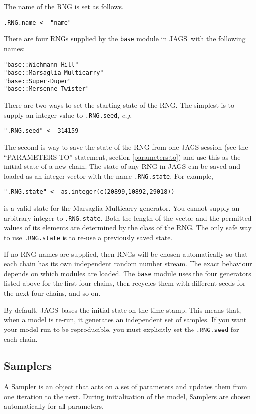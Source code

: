 \documentclass[11pt, a4paper, titlepage]{report}
\newcommand{\JAGS}{\textsf{JAGS}}
\begin{document}
The name of the RNG is set as follows. 
\begin{verbatim}
.RNG.name <- "name"
\end{verbatim}
There are four RNGs supplied by the \texttt{base} module in \JAGS\
with the following names:
\begin{verbatim}
"base::Wichmann-Hill"
"base::Marsaglia-Multicarry"
"base::Super-Duper"
"base::Mersenne-Twister"
\end{verbatim}

There are two ways to set the starting state of the RNG. The simplest
is to supply an integer value to \texttt{.RNG.seed}, {\em e.g.}
\begin{verbatim}
".RNG.seed" <- 314159
\end{verbatim}
The second is way to save the state of the RNG from one JAGS session
(see the ``PARAMETERS TO'' statement, section \ref{parameters:to}) and
use this as the initial state of a new chain. The state of any RNG in
JAGS can be saved and loaded as an integer vector with the name
\texttt{.RNG.state}. For example,
\begin{verbatim}
".RNG.state" <- as.integer(c(20899,10892,29018))
\end{verbatim}
is a valid state for the Marsaglia-Multicarry generator.  You cannot
supply an arbitrary integer to \texttt{.RNG.state}. Both the length of
the vector and the permitted values of its elements are determined by
the class of the RNG. The only safe way to use \texttt{.RNG.state} is
to re-use a previously saved state.

If no RNG names are supplied, then RNGs will be chosen automatically
so that each chain has its own independent random number stream.  The
exact behaviour depends on which modules are loaded. The \texttt{base}
module uses the four generators listed above for the first four
chains, then recycles them with different seeds for the next four
chains, and so on.  

By default, \JAGS\ bases the initial state on the time stamp. This
means that, when a model is re-run, it generates an independent set of
samples. If you want your model run to be reproducible, you must
explicitly set the \verb+.RNG.seed+ for each chain.

\subsection{Samplers}

A Sampler is an object that acts on a set of parameters and updates
them from one iteration to the next. During initialization of the
model, Samplers are chosen automatically for all parameters. 
\end{document}
